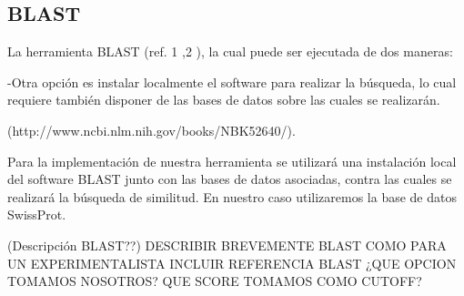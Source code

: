 \subsection{BLAST}\label{blast}

La herramienta BLAST (ref. 1 ,2 ), la cual puede ser ejecutada de dos maneras:

 
    -Otra opción es instalar localmente el software para realizar la búsqueda, lo cual requiere también disponer de las bases de datos sobre las cuales se realizarán.
    
    (http://www.ncbi.nlm.nih.gov/books/NBK52640/).


Para la implementación de nuestra herramienta se utilizará una instalación local del software BLAST junto con las bases de datos asociadas, contra las cuales se realizará la búsqueda de similitud. 
En nuestro caso utilizaremos la base de datos SwissProt.

(Descripción BLAST??)
DESCRIBIR BREVEMENTE BLAST COMO PARA UN EXPERIMENTALISTA
INCLUIR REFERENCIA BLAST
¿QUE OPCION TOMAMOS NOSOTROS?
QUE SCORE TOMAMOS COMO CUTOFF?


